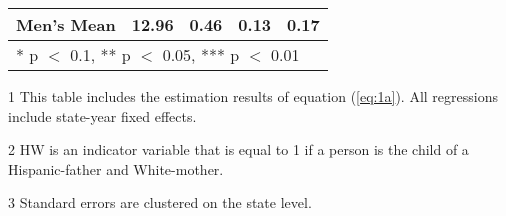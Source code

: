 \begin{table}[H]
\begin{threeparttable}
\begin{tabular}[t]{lcccc}
Men's Mean & 12.96 & 0.46 & 0.13 & 0.17\\
\bottomrule
\multicolumn{5}{l}{\rule{0pt}{1em}* p $<$ 0.1, ** p $<$ 0.05, *** p $<$ 0.01}\\
\end{tabular}
\begin{tablenotes}
\item[1] {\footnotesize{This table includes the estimation results of equation (\ref{eq:1a}). All regressions include state-year fixed effects.}}
\item[2] {\footnotesize{HW is an indicator variable that is equal to 1 if a person is the child of a Hispanic-father and White-mother.}}
\item[3] {\footnotesize{Standard errors are clustered on the state level.}}
\end{tablenotes}
\end{threeparttable}
\end{table}
